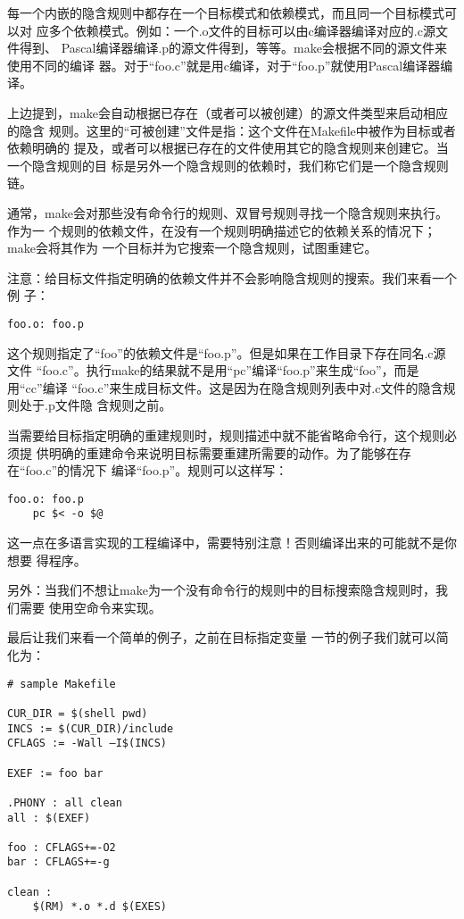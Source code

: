 每一个内嵌的隐含规则中都存在一个目标模式和依赖模式，而且同一个目标模式可以对
应多个依赖模式。例如：一个.o文件的目标可以由c编译器编译对应的.c源文件得到、
Pascal编译器编译.p的源文件得到，等等。make会根据不同的源文件来使用不同的编译
器。对于“foo.c”就是用c编译，对于“foo.p”就使用Pascal编译器编译。

上边提到，make会自动根据已存在（或者可以被创建）的源文件类型来启动相应的隐含
规则。这里的“可被创建”文件是指：这个文件在Makefile中被作为目标或者依赖明确的
提及，或者可以根据已存在的文件使用其它的隐含规则来创建它。当一个隐含规则的目
标是另外一个隐含规则的依赖时，我们称它们是一个隐含规则链。

通常，make会对那些没有命令行的规则、双冒号规则寻找一个隐含规则来执行。作为一
个规则的依赖文件，在没有一个规则明确描述它的依赖关系的情况下；make会将其作为
一个目标并为它搜索一个隐含规则，试图重建它。

注意：给目标文件指定明确的依赖文件并不会影响隐含规则的搜索。我们来看一个例
子：

\begin{Verbatim}[]
foo.o: foo.p
\end{Verbatim}

这个规则指定了“foo”的依赖文件是“foo.p”。但是如果在工作目录下存在同名.c源文件
“foo.c”。执行make的结果就不是用“pc”编译“foo.p”来生成“foo”，而是用“cc”编译
“foo.c”来生成目标文件。这是因为在隐含规则列表中对.c文件的隐含规则处于.p文件隐
含规则之前。

当需要给目标指定明确的重建规则时，规则描述中就不能省略命令行，这个规则必须提
供明确的重建命令来说明目标需要重建所需要的动作。为了能够在存在“foo.c”的情况下
编译“foo.p”。规则可以这样写：
\begin{Verbatim}[]
foo.o: foo.p
    pc $< -o $@
\end{Verbatim}

这一点在多语言实现的工程编译中，需要特别注意！否则编译出来的可能就不是你想要
得程序。

另外：当我们不想让make为一个没有命令行的规则中的目标搜索隐含规则时，我们需要
使用空命令来实现。

最后让我们来看一个简单的例子，之前在目标指定变量 一节的例子我们就可以简化为：

\begin{Verbatim}[]
# sample Makefile

CUR_DIR = $(shell pwd)
INCS := $(CUR_DIR)/include
CFLAGS := -Wall –I$(INCS)

EXEF := foo bar

.PHONY : all clean
all : $(EXEF)

foo : CFLAGS+=-O2
bar : CFLAGS+=-g

clean :
    $(RM) *.o *.d $(EXES)
\end{Verbatim}

